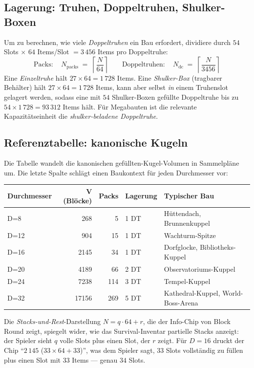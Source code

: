 \documentclass[12pt,a4paper]{scrartcl}
\begin{document}
\subsection{Lagerung: Truhen, Doppeltruhen, Shulker-Boxen}
Um zu berechnen, wie viele \emph{Doppeltruhen} ein Bau erfordert, dividiere durch $54$ Slots $\times$ $64$ Items/Slot $= 3\,456$ Items pro Doppeltruhe:
\[
\text{Packs}:\quad N_{\mathrm{packs}} \;=\; \left\lceil \dfrac{N}{64} \right\rceil
\qquad
\text{Doppeltruhen}:\quad N_{\mathrm{dc}} \;=\; \left\lceil \dfrac{N}{3456} \right\rceil
\]
Eine \emph{Einzeltruhe} hält $27 \times 64 = 1\,728$ Items. Eine \emph{Shulker-Box} (tragbarer Behälter) hält $27 \times 64 = 1\,728$ Items, kann aber selbst \emph{in} einem Truhenslot gelagert werden, sodass eine mit $54$ Shulker-Boxen gefüllte Doppeltruhe bis zu $54 \times 1\,728 = 93\,312$ Items hält. Für Megabauten ist die relevante Kapazitätseinheit die \emph{shulker-beladene Doppeltruhe}.

\subsection{Referenztabelle: kanonische Kugeln}
Die Tabelle wandelt die kanonischen gefüllten-Kugel-Volumen in Sammelpläne um. Die letzte Spalte schlägt einen Baukontext für jeden Durchmesser vor:
\nopagebreak

\vspace{0.4em}
\begin{center}
\small
\begin{tabularx}{\textwidth}{@{}lrrlX@{}}
\toprule
\textbf{Durchmesser} & \textbf{V (Blöcke)} & \textbf{Packs} & \textbf{Lagerung} & \textbf{Typischer Bau} \\
\midrule
D=8   &   268 &  5  &  1 DT & Hüttendach, Brunnenkuppel  \\
D=12  &   904 & 15  &  1 DT & Wachturm-Spitze \\
D=16  &  2145 & 34  &  1 DT & Dorfglocke, Bibliotheks-Kuppel \\
D=20  &  4189 & 66  &  2 DT & Observatoriums-Kuppel \\
D=24  &  7238 & 114 &  3 DT & Tempel-Kuppel \\
D=32  & 17156 & 269 &  5 DT & Kathedral-Kuppel, World-Boss-Arena \\
\bottomrule
\end{tabularx}
\end{center}

Die \emph{Stacks-und-Rest}-Darstellung $N = q \cdot 64 + r$, die der Info-Chip von Block Round zeigt, spiegelt wider, wie das Survival-Inventar partielle Stacks anzeigt: der Spieler sieht $q$ volle Slots plus einen Slot, der $r$ zeigt. Für $D=16$ druckt der Chip \enquote{$2\,145$ ($33 \times 64 + 33$)}, was dem Spieler sagt, $33$ Slots vollständig zu füllen plus einen Slot mit $33$ Items --- genau $34$ Slots.
\end{document}
